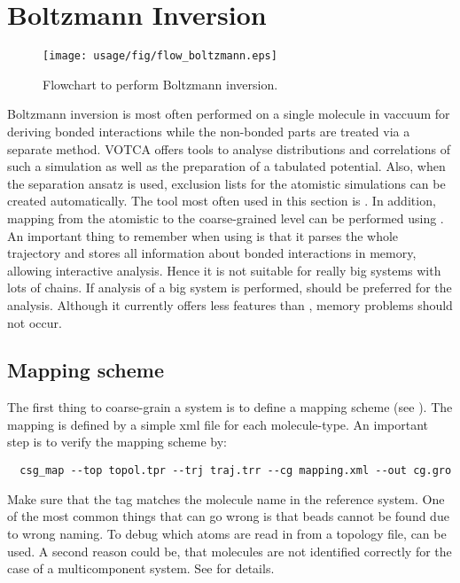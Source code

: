 \chapter{Boltzmann Inversion}
\begin{figure}
   \centering
   \texttt{[image: usage/fig/flow\_boltzmann.eps]}
   \caption{Flowchart to perform Boltzmann inversion.}
\end{figure}

Boltzmann inversion is most often performed on a single molecule in vaccuum for deriving bonded interactions while the non-bonded parts are treated via a separate method. VOTCA offers tools to analyse distributions and correlations of such a simulation as well as the preparation of a tabulated potential. Also, when the separation ansatz\cite{Tschoep:1998} is used, exclusion lists for the atomistic simulations can be created automatically. The tool most often used in this section is . In addition,  mapping from the atomistic to the coarse-grained level can be performed using . An important thing to remember when using  is that it parses the whole trajectory and stores all information about bonded interactions in memory, allowing interactive analysis. Hence it is not suitable for really big systems with lots of chains. If analysis of a big system is performed,  should be preferred for the analysis. Although it currently offers less features than , memory problems should not occur.

\section{Mapping scheme}
The first thing to coarse-grain a system is to define a mapping scheme (see ). The mapping is defined by a simple xml file for each molecule-type. An important step is to verify the mapping scheme by:

\begin{verbatim}
  csg_map --top topol.tpr --trj traj.trr --cg mapping.xml --out cg.gro
\end{verbatim}

Make sure that the  tag matches the molecule name in the reference system. One of the most common things that can go wrong is that beads cannot be found due to wrong naming. To debug which atoms are read in from a topology file,  can be used. A second reason could be, that molecules are not identified correctly for the case of a multicomponent system. See  for details.

